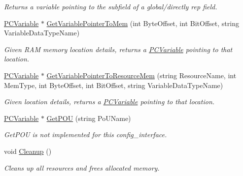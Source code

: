 \begin{DoxyCompactItemize}
\begin{DoxyCompactList}\small\item\em Returns a variable pointing to the subfield of a global/directly rep field. \end{DoxyCompactList}\item 
\hyperlink{classpc__emulator_1_1PCVariable}{P\+C\+Variable} $\ast$ \hyperlink{classpc__emulator_1_1PCConfigurationInterface_acb1683a6a66be801c69c30f36eeaea2f}{Get\+Variable\+Pointer\+To\+Mem} (int Byte\+Offset, int Bit\+Offset, string Variable\+Data\+Type\+Name)
\begin{DoxyCompactList}\small\item\em Given R\+AM memory location details, returns a \hyperlink{classpc__emulator_1_1PCVariable}{P\+C\+Variable} pointing to that location. \end{DoxyCompactList}\item 
\hyperlink{classpc__emulator_1_1PCVariable}{P\+C\+Variable} $\ast$ \hyperlink{classpc__emulator_1_1PCConfigurationInterface_a81941aeda8ffef0e15f3591999c3a58e}{Get\+Variable\+Pointer\+To\+Resource\+Mem} (string Resource\+Name, int Mem\+Type, int Byte\+Offset, int Bit\+Offset, string Variable\+Data\+Type\+Name)
\begin{DoxyCompactList}\small\item\em Given location details, returns a \hyperlink{classpc__emulator_1_1PCVariable}{P\+C\+Variable} pointing to that location. \end{DoxyCompactList}\item 
\hyperlink{classpc__emulator_1_1PCVariable}{P\+C\+Variable} $\ast$ \hyperlink{classpc__emulator_1_1PCConfigurationInterface_a7398812afc40eba633c27f3e4c5afbde}{Get\+P\+OU} (string Po\+U\+Name)\hypertarget{classpc__emulator_1_1PCConfigurationInterface_a7398812afc40eba633c27f3e4c5afbde}{}\label{classpc__emulator_1_1PCConfigurationInterface_a7398812afc40eba633c27f3e4c5afbde}

\begin{DoxyCompactList}\small\item\em Get\+P\+OU is not implemented for this config\+\_\+interface. \end{DoxyCompactList}\item 
void \hyperlink{classpc__emulator_1_1PCConfigurationInterface_aab4b87faab438a8a73c9dc58a741cf90}{Cleanup} ()\hypertarget{classpc__emulator_1_1PCConfigurationInterface_aab4b87faab438a8a73c9dc58a741cf90}{}\label{classpc__emulator_1_1PCConfigurationInterface_aab4b87faab438a8a73c9dc58a741cf90}

\begin{DoxyCompactList}\small\item\em Cleans up all resources and frees allocated memory. \end{DoxyCompactList}\end{DoxyCompactItemize}
